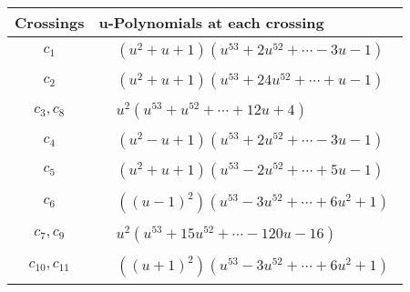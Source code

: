 \documentclass[1p]{elsarticle_modified}
\theoremstyle{definition}
\begin{document}
\begin{tabular}{m{50pt}|m{274pt}}
Crossings & \hspace{64pt}u-Polynomials at each crossing \\
\hline $$\begin{aligned}c_{1}\end{aligned}$$&$\begin{aligned}
&(u^2+u+1)(u^{53}+2 u^{52}+\cdots-3 u-1)
\end{aligned}$\\
\hline $$\begin{aligned}c_{2}\end{aligned}$$&$\begin{aligned}
&(u^2+u+1)(u^{53}+24 u^{52}+\cdots+u-1)
\end{aligned}$\\
\hline $$\begin{aligned}c_{3},c_{8}\end{aligned}$$&$\begin{aligned}
&u^2(u^{53}+u^{52}+\cdots+12 u+4)
\end{aligned}$\\
\hline $$\begin{aligned}c_{4}\end{aligned}$$&$\begin{aligned}
&(u^2- u+1)(u^{53}+2 u^{52}+\cdots-3 u-1)
\end{aligned}$\\
\hline $$\begin{aligned}c_{5}\end{aligned}$$&$\begin{aligned}
&(u^2+u+1)(u^{53}-2 u^{52}+\cdots+5 u-1)
\end{aligned}$\\
\hline $$\begin{aligned}c_{6}\end{aligned}$$&$\begin{aligned}
&((u-1)^2)(u^{53}-3 u^{52}+\cdots+6 u^2+1)
\end{aligned}$\\
\hline $$\begin{aligned}c_{7},c_{9}\end{aligned}$$&$\begin{aligned}
&u^2(u^{53}+15 u^{52}+\cdots-120 u-16)
\end{aligned}$\\
\hline $$\begin{aligned}c_{10},c_{11}\end{aligned}$$&$\begin{aligned}
&((u+1)^2)(u^{53}-3 u^{52}+\cdots+6 u^2+1)
\end{aligned}$\\
\hline
\end{tabular}\newpage\renewcommand{\arraystretch}{1}
\end{document}
